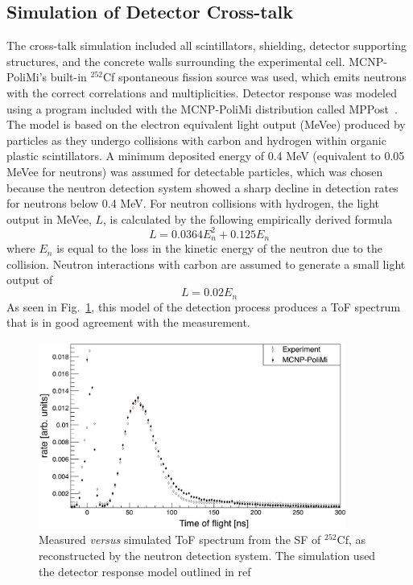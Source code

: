 \subsection{Simulation of Detector Cross-talk}
The cross-talk simulation included all scintillators, shielding, detector supporting structures, and the concrete walls surrounding the experimental cell.
MCNP-PoliMi's built-in $^{252}$Cf spontaneous fission source was used, which emits neutrons with the correct correlations and multiplicities.
Detector response was modeled using a program included with the MCNP-PoliMi distribution called MPPost~\cite{MPPost}.
The model is based on the electron equivalent light output (MeVee) produced by particles as they undergo collisions with carbon and hydrogen within organic plastic scintillators.
A minimum deposited energy of 0.4 MeV (equivalent to 0.05 MeVee for neutrons) was assumed for detectable particles, which was chosen because the neutron detection system showed a sharp decline in detection rates for neutrons below 0.4 MeV.
For neutron collisions with hydrogen, the light output in MeVee, $L$, is calculated by the following empirically derived formula
\begin{displaymath}
L = 0.0364 E_n^2 +  0.125 E_n
\end{displaymath}
where $E_n$ is equal to the loss in the kinetic energy of the neutron due to the collision.
Neutron interactions with carbon are assumed to generate a small light output of
\begin{displaymath}
L = 0.02 E_n
\end{displaymath}
As seen in Fig.~\ref{fig:Cf252MCNPVsEXP}, this model of the detection process produces a ToF spectrum that is in good agreement with the measurement.
\begin{figure}
    \centering
    \includegraphics[width = 0.9\textwidth]{Content/Errors/Cf252MCNPVsEXP.png}
    \caption{Measured \emph{versus} simulated ToF spectrum from the SF of $^{252}$Cf, as reconstructed by the neutron detection system.
        The simulation used the detector response model outlined in ref~\cite{MPPost}}
    \label{fig:Cf252MCNPVsEXP}
\end{figure}

